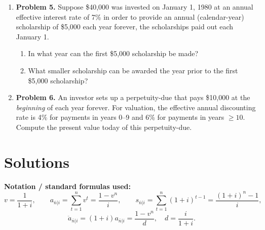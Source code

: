 \documentclass[11pt]{article}
\begin{document}
\begin{enumerate}[leftmargin=*,itemsep=12pt]
\item \textbf{Problem 5.} Suppose \$40,000 was invested on January 1, 1980 at an annual effective interest rate of 7\% in order to provide an annual (calendar-year) scholarship of \$5,000 each year forever, the scholarships paid out each January 1. \begin{enumerate} \item In what year can the first \$5,000 scholarship be made? \item What smaller scholarship can be awarded the year prior to the first \$5,000 scholarship? \end{enumerate}

  \item \textbf{Problem 6.} An investor sets up a perpetuity-due that pays \$10,000 at the \emph{beginning} of each year forever. For valuation, the effective annual discounting rate is 4\% for payments in years 0–9 and 6\% for payments in years \(\ge 10\). Compute the present value today of this perpetuity-due.
\end{enumerate}

\newpage
\section*{Solutions}

\textbf{Notation / standard formulas used:}
\[
v=\frac{1}{1+i},\qquad a_{\overline{n}|i}=\sum_{t=1}^n v^t=\frac{1-v^n}{i},\qquad
s_{\overline{n}|i}=\sum_{t=1}^n(1+i)^{t-1}=\frac{(1+i)^n-1}{i},
\]
\[
\ddot a_{\overline{n}|i}=(1+i)a_{\overline{n}|i}=\frac{1-v^n}{d},\quad d=\frac{i}{1+i}.
\]

\bigskip
\end{document}
